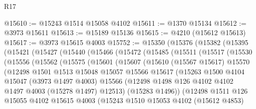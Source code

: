 \begin{lexlean}{R17}
\begin{coremodule}
@15610 := @15243 @1514 @15058 @4102
@15611 := @1370 @15134
@15612 := @3973 @15611
@15613 := @15189 @15136
@15615 := @4210 (@15612 @15613)
@15617 := @3973 @15615 @4003
@15752 := @15350
    (@15376
      (@15382
        (@15395
          (@15421
            (@15427
              (@15440
                (@15466
                  (@15472
                    (@15485
                      (@15511
                        (@15517
                          (@15530
                            (@15556
                              (@15562
                                (@15575
                                  (@15601
                                    (@15607
                                      (@15610
                                        (@15567 @15617)
                                        @15570
                                        (@12498
                                          @1501
                                          @1513
                                          @15048
                                          @15057
                                          @15566
                                          @15617
                                          (@15263
                                            @1500
                                            @4104
                                            @15047
                                            (@3973 @1497 @4003)
                                            @15566
                                            (@12498
                                              @1498
                                              @126
                                              @4102
                                              @4102
                                              @1497
                                              @4003
                                              (@15278 @1497)
                                              @12513)
                                            (@15283 @1496))
                                          (@12498
                                            @1511
                                            @126
                                            @15055
                                            @4102
                                            @15615
                                            @4003
                                            (@15243
                                              @1510
                                              @15053
                                              @4102
                                              (@15612 @4853)

\end{coremodule}
\end{lexlean}
